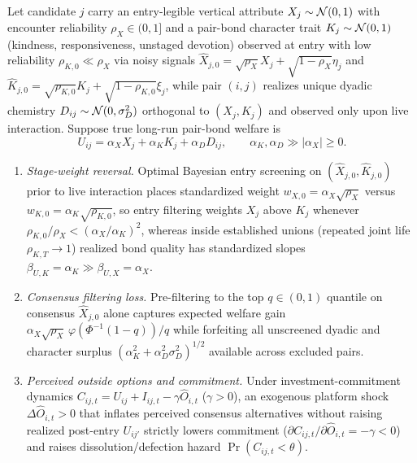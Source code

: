 \begin{proposition}\label{prop:love}
Let candidate $j$ carry an entry-legible vertical attribute $X_j\sim\mathcal{N}(0,1)$ with encounter reliability $\rho_X\in(0,1]$ and a pair-bond character trait $K_j\sim\mathcal{N}(0,1)$ (kindness, responsiveness, unstaged devotion) observed at entry with low reliability $\rho_{K,0}\ll\rho_X$ via noisy signals $\hat X_{j,0}=\sqrt{\rho_X}X_j+\sqrt{1-\rho_X}\eta_j$ and $\hat K_{j,0}=\sqrt{\rho_{K,0}}K_j+\sqrt{1-\rho_{K,0}}\xi_j$, while pair $(i,j)$ realizes unique dyadic chemistry $D_{ij}\sim\mathcal{N}(0,\sigma_D^2)$ orthogonal to $(X_j,K_j)$ and observed only upon live interaction. Suppose true long-run pair-bond welfare is
\begin{equation}
U_{ij}=\alpha_X X_j+\alpha_K K_j+\alpha_D D_{ij},\qquad \alpha_K,\alpha_D\gg|\alpha_X|\ge 0.\label{eq:pairwelfare}
\end{equation}
\begin{enumerate}
\item[(i)] \emph{Stage-weight reversal.} Optimal Bayesian entry screening on $(\hat X_{j,0},\hat K_{j,0})$ prior to live interaction places standardized weight $w_{X,0}=\alpha_X\sqrt{\rho_X}$ versus $w_{K,0}=\alpha_K\sqrt{\rho_{K,0}}$, so entry filtering weights $X_j$ above $K_j$ whenever $\rho_{K,0}/\rho_X<(\alpha_X/\alpha_K)^2$, whereas inside established unions (repeated joint life $\rho_{K,T}\to 1$) realized bond quality has standardized slopes $\beta_{U,K}=\alpha_K\gg\beta_{U,X}=\alpha_X$.
\item[(ii)] \emph{Consensus filtering loss.} Pre-filtering to the top $q\in(0,1)$ quantile on consensus $\hat X_{j,0}$ alone captures expected welfare gain $\alpha_X\sqrt{\rho_X}\,\varphi(\Phi^{-1}(1-q))/q$ while forfeiting all unscreened dyadic and character surplus $(\alpha_K^2+\alpha_D^2\sigma_D^2)^{1/2}$ available across excluded pairs.
\item[(iii)] \emph{Perceived outside options and commitment.} Under investment-commitment dynamics $C_{ij,t}=U_{ij}+I_{ij,t}-\gamma\widehat{O}_{i,t}$ ($\gamma>0$), an exogenous platform shock $\Delta\widehat{O}_{i,t}>0$ that inflates perceived consensus alternatives without raising realized post-entry $U_{ij'}$ strictly lowers commitment ($\partial C_{ij,t}/\partial\widehat{O}_{i,t}=-\gamma<0$) and raises dissolution/defection hazard $\Pr(C_{ij,t}<\theta)$.
\end{enumerate}
\end{proposition}


